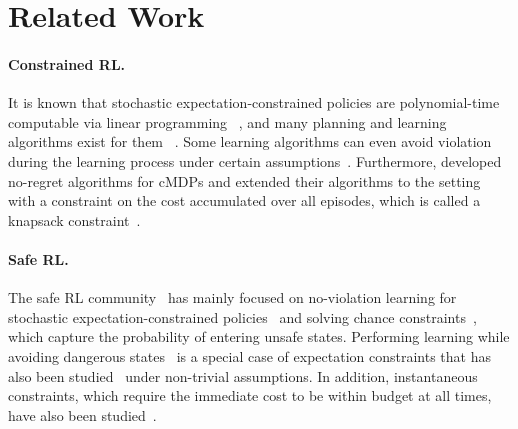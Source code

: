 \section{Related Work}
\label{subsec: related-work}

\paragraph{Constrained RL.} It is known that stochastic expectation-constrained policies are polynomial-time computable via linear programming ~\cite{cMDP-book}, and many planning and learning algorithms exist for them ~\cite{cMDP-ZeroDualityGap, cMDP-Pac, cMDP-Actor-Critic, cMDP-sample-complexity-safe}. Some learning algorithms can even avoid violation during the learning process under certain assumptions~\cite{cMDP-Model-Violation-Free, NoViolationPolicyGradient}. Furthermore, \citet{Knap-Brantley} developed no-regret algorithms for cMDPs and extended their algorithms to the setting with a constraint on the cost accumulated over all episodes, which is called a knapsack constraint~\cite{Knap-Brantley, Knap-PreBrantley}.


\paragraph{Safe RL.} The safe RL community~\cite{SafeComprSurvey, SafeReview} has mainly focused on no-violation learning for stochastic expectation-constrained policies~\cite{SafeLyapunov, SafeE4, SafeShielding, SafeBarrier, SafeStable} and solving chance constraints~\cite{SafeHardBarrier, SafeStateSurvey}, which capture the probability of entering unsafe states. Performing learning while avoiding dangerous states~\cite{SafeStateSurvey} is a special case of expectation constraints that has also been studied~\cite{SafeStatePAC, Safe-RL-Imagining} under non-trivial assumptions. In addition, instantaneous constraints, which require the immediate cost to be within budget at all times, have also been studied~\cite{InstantaneousSafeRL, PreInstantaneous1, PreInstantaneous2}.
